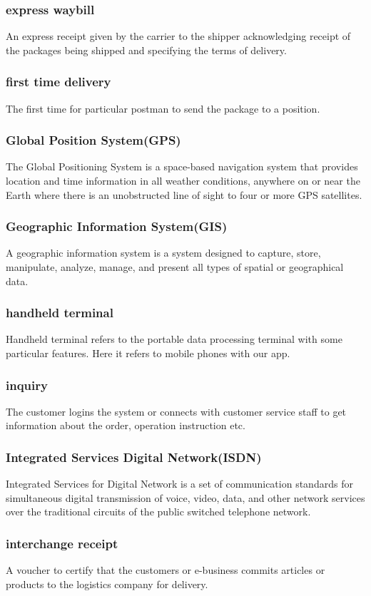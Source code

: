 \documentclass[12pt]{scrreprt}
\begin{document}
\begin{spacing}{0.7}
\subsubsection{express waybill}
An express receipt given by the carrier to the shipper acknowledging receipt
of the packages being shipped and specifying the terms of delivery.
\subsubsection{first time delivery}
The first time for particular postman to send the package to a position.
\subsubsection{Global Position System(GPS)}
The Global Positioning System is a space-based navigation system that
provides location and time information in all weather conditions,
anywhere on or near the Earth where there is an unobstructed line of
sight to four or more GPS satellites.
\subsubsection{Geographic Information System(GIS)}
A geographic information system is a system designed to capture,
store, manipulate, analyze, manage, and present all types of spatial
or geographical data.
\subsubsection{handheld terminal}
Handheld terminal refers to the portable data processing terminal
with some particular features. Here it refers to mobile phones with our app.
\subsubsection{inquiry}
The customer logins the system or connects with customer service staff to get
information about the order, operation instruction etc.
\subsubsection{Integrated Services Digital Network(ISDN)}
Integrated Services for Digital Network is a set of communication standards
for simultaneous digital transmission of voice, video, data, and other
network services over the traditional circuits of the public switched
telephone network.
\subsubsection{interchange receipt}
A voucher to certify that the customers or e-business commits articles
or products to the logistics company for delivery.

\end{spacing}
\end{document}

